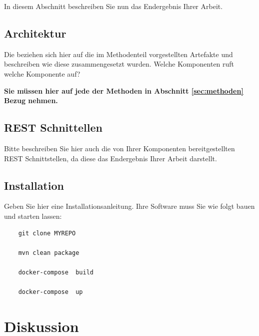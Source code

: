 \documentclass[fleqn,10pt,ngerman]{SelfArx}
\begin{document}
	In diesem Abschnitt beschreiben Sie nun das Endergebnis Ihrer Arbeit. 
	\subsection{Architektur}
	
	Die beziehen sich hier auf die im Methodenteil vorgestellten Artefakte und beschreiben wie diese zusammengesetzt wurden. Welche Komponenten ruft welche Komponente auf? 
	
	\textbf{{Sie müssen hier auf jede der Methoden in Abschnitt} \ref{sec:methoden} Bezug nehmen.}
	
	
	\subsection{REST Schnittellen}
	Bitte beschreiben Sie hier auch die von Ihrer Komponenten bereitgestellten REST Schnittstellen, da diese das Endergebnis Ihrer Arbeit darstellt. 
	
	\subsection{Installation}
	Geben Sie hier eine Installationsanleitung. Ihre Software muss Sie wie folgt bauen und starten lassen: 
	
	\begin{lstlisting}
	git clone MYREPO
	
	mvn clean package
	
	docker-compose  build 
	
	docker-compose  up
	\end{lstlisting}
	
	
	
	\section{Diskussion}
	
\end{document}
